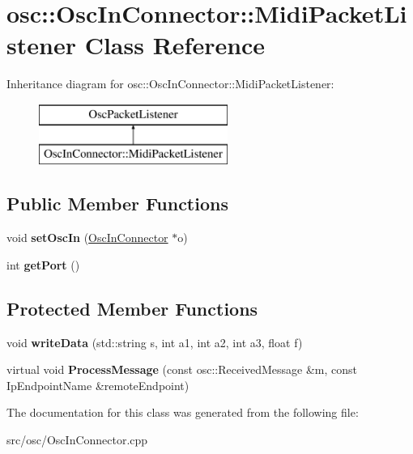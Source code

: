 \hypertarget{classOscInConnector_1_1MidiPacketListener}{\section{osc\-:\-:Osc\-In\-Connector\-:\-:Midi\-Packet\-Listener Class Reference}
\label{classOscInConnector_1_1MidiPacketListener}
}
Inheritance diagram for osc\-:\-:Osc\-In\-Connector\-:\-:Midi\-Packet\-Listener\-:\begin{figure}[H]
\begin{center}
\leavevmode
\includegraphics[height=2.000000cm]{classOscInConnector_1_1MidiPacketListener}
\end{center}
\end{figure}
\subsection*{Public Member Functions}
\begin{DoxyCompactItemize}
\item 
\hypertarget{classOscInConnector_1_1MidiPacketListener_a184cd179631e0405cf51fc9d5787ad68}{void {\bfseries set\-Osc\-In} (\hyperlink{classosc_1_1OscInConnector}{Osc\-In\-Connector} $\ast$o)}\label{classOscInConnector_1_1MidiPacketListener_a184cd179631e0405cf51fc9d5787ad68}

\item 
\hypertarget{classOscInConnector_1_1MidiPacketListener_af32366a75578da1b15ecb54beb7633e5}{int {\bfseries get\-Port} ()}\label{classOscInConnector_1_1MidiPacketListener_af32366a75578da1b15ecb54beb7633e5}

\end{DoxyCompactItemize}
\subsection*{Protected Member Functions}
\begin{DoxyCompactItemize}
\item 
\hypertarget{classOscInConnector_1_1MidiPacketListener_afd16b4451a05a986f23a084d0414b1a4}{void {\bfseries write\-Data} (std\-::string s, int a1, int a2, int a3, float f)}\label{classOscInConnector_1_1MidiPacketListener_afd16b4451a05a986f23a084d0414b1a4}

\item 
\hypertarget{classOscInConnector_1_1MidiPacketListener_a5fa1f1bee930939a8a3a0f127eda5a35}{virtual void {\bfseries Process\-Message} (const osc\-::\-Received\-Message \&m, const Ip\-Endpoint\-Name \&remote\-Endpoint)}\label{classOscInConnector_1_1MidiPacketListener_a5fa1f1bee930939a8a3a0f127eda5a35}

\end{DoxyCompactItemize}


The documentation for this class was generated from the following file\-:\begin{DoxyCompactItemize}
\item 
src/osc/Osc\-In\-Connector.\-cpp\end{DoxyCompactItemize}
